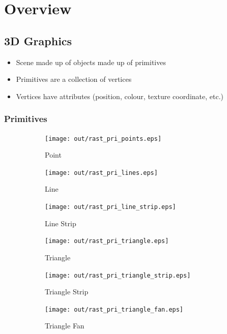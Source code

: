 \documentclass[a4paper]{article}
\begin{document}
\tableofcontents

\section{Overview}

\subsection{3D Graphics}

\begin{itemize}
  \item Scene made up of objects made up of primitives
  \item Primitives are a collection of vertices
  \item Vertices have attributes (position, colour, texture coordinate, etc.)
\end{itemize}

\subsubsection{Primitives}

\begin{figure}[h]
  \centering

  \begin{subfigure}[b]{0.3\textwidth}
    \texttt{[image: out/rast\_pri\_points.eps]}
    \caption{Point}
  \end{subfigure}
  \begin{subfigure}[b]{0.3\textwidth}
    \texttt{[image: out/rast\_pri\_lines.eps]}
    \caption{Line}
  \end{subfigure}
  \begin{subfigure}[b]{0.3\textwidth}
    \texttt{[image: out/rast\_pri\_line\_strip.eps]}
    \caption{Line Strip}
  \end{subfigure}

  \vspace{2em}

  \begin{subfigure}[b]{0.3\textwidth}
    \texttt{[image: out/rast\_pri\_triangle.eps]}
    \caption{Triangle}
  \end{subfigure}
  \begin{subfigure}[b]{0.3\textwidth}
    \texttt{[image: out/rast\_pri\_triangle\_strip.eps]}
    \caption{Triangle Strip}
  \end{subfigure}
  \begin{subfigure}[b]{0.3\textwidth}
    \texttt{[image: out/rast\_pri\_triangle\_fan.eps]}
    \caption{Triangle Fan}
  \end{subfigure}

  \caption{}
  \label{fig:primitives}
\end{figure}
\FloatBarrier
\end{document}
